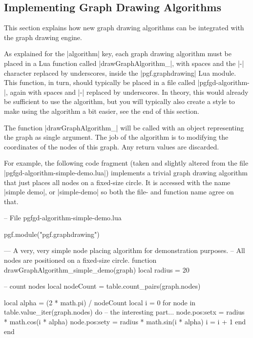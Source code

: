 \subsection{Implementing Graph Drawing Algorithms}

\label{section-gd-own-algorithm}
\label{section-library-graphdrawing-ownAlgorithm}

This section explains how new graph drawing algorithms can be
integrated with the graph drawing engine.

As explained for the |algorithm| key, each graph drawing algorithm
must be placed in a Lua function called
|drawGraphAlgorithm_|, with spaces and the |-|
character replaced by underscores, inside the |pgf.graphdrawing| Lua 
module. This function, in turn, should typically be placed in a file 
called |pgfgd-algorithm-|, again with spaces and
|-| replaced by underscores. In theory, this would already be 
sufficient to use the algorithm, but you will typically also create 
a style to make using the algorithm a bit easier, see the end of this 
section.

The function |drawGraphAlgorithm_| will be called
with an object representing the graph as single argument. The job of
the algorithm is to modifying the coordinates of the nodes of this
graph. Any return values are discarded. 

For example, the following code fragment (taken and slightly altered
from the file |pgfgd-algorithm-simple-demo.lua|)
implements a trivial graph drawing algorithm that just places all
nodes on a fixed-size circle.  It is accessed with the name
|simple demo|, or |simple-demo| so both the file- and function name 
agree on that.

\begin{codeexample}
-- File pgfgd-algorithm-simple-demo.lua
  
pgf.module("pgf.graphdrawing")

--- A very, very simple node placing algorithm for demonstration purposes.
-- All nodes are positioned on a fixed-size circle.
function drawGraphAlgorithm_simple_demo(graph)
   local radius = 20

   -- count nodes
   local nodeCount = table.count_pairs(graph.nodes)

   local alpha = (2 * math.pi) / nodeCount
   local i = 0
   for node in table.value_iter(graph.nodes) do
      -- the interesting part...
      node.pos:set{x = radius * math.cos(i * alpha)}
      node.pos:set{y = radius * math.sin(i * alpha)}
      i = i + 1
   end
end
\end{codeexample}

